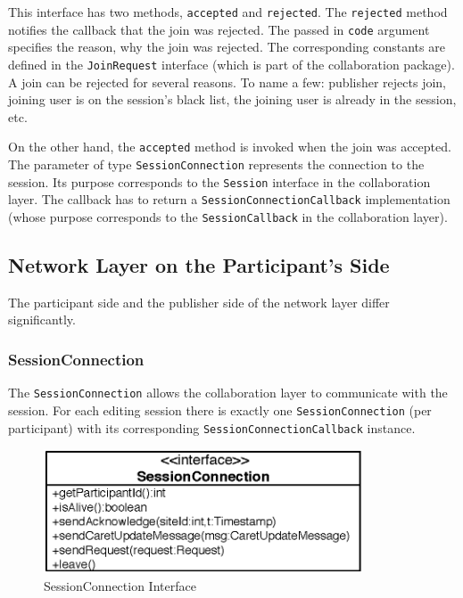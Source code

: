 This interface has two methods, \texttt{accepted} and \texttt{rejected}.
The \texttt{rejected} method notifies the callback that the join
was rejected. The passed in \texttt{code} argument specifies the reason, why
the join was rejected. The corresponding constants are defined in the
\texttt{Join\-Request} interface (which is part of the collaboration package). 
A join can be rejected for several reasons.
To name a few: publisher rejects join, joining user is on the session's 
black list, the joining user is already in the session, etc.

On the other hand, the \texttt{accepted} method is invoked when the join
was accepted. The parameter of type \texttt{Session\-Connection} represents
the connection to the session. Its purpose corresponds to the \texttt{Session}
interface in the collaboration layer. The callback has to return a
\texttt{Session\-Connection\-Callback} implementation (whose purpose corresponds
to the \texttt{Session\-Callback} in the collaboration layer).



\subsection{Network Layer on the Participant's Side}
The participant side and the publisher side of the network layer differ
significantly.

\subsubsection{SessionConnection}
The \texttt{Session\-Connection} allows the collaboration layer to
communicate with the session. For each editing session there is
exactly one \texttt{Session\-Connection} (per participant) with its corresponding \texttt{Session\-Connection\-Callback} instance.

\begin{figure}[H]
 \centering
 \includegraphics[width=9.45cm,height=3.67cm]{../images/finalreport/architecture_sessionconnection_uml.eps}
 \caption{SessionConnection Interface}
\end{figure}

